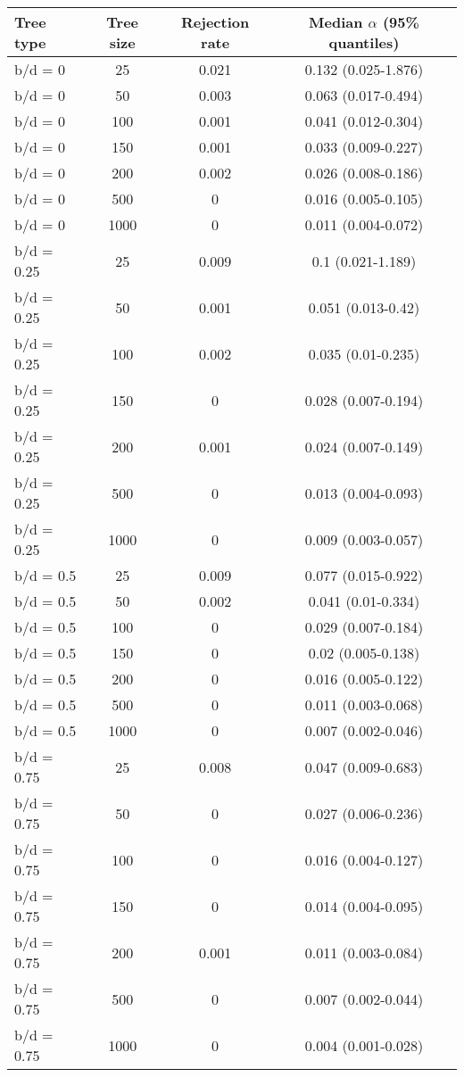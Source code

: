 \begin{tabular}{lccc}
     \hline
     \textbf{Tree type} & \textbf{Tree size} & \textbf{Rejection rate}  & \textbf{Median $\alpha$ (95\% quantiles)}    \\
     \hline
b/d = 0   &    25   &    0.021     &    0.132 (0.025-1.876) \\
b/d = 0   &    50   &    0.003     &    0.063 (0.017-0.494) \\
b/d = 0   &    100  &    0.001     &    0.041 (0.012-0.304) \\
b/d = 0   &    150  &    0.001     &    0.033 (0.009-0.227) \\
b/d = 0   &    200  &    0.002     &    0.026 (0.008-0.186) \\
b/d = 0   &    500  &    0    &    0.016 (0.005-0.105) \\
b/d = 0   &    1000 &    0    &    0.011 (0.004-0.072) \\
b/d = 0.25     &    25   &    0.009     &    0.1 (0.021-1.189)   \\
b/d = 0.25     &    50   &    0.001     &    0.051 (0.013-0.42)  \\
b/d = 0.25     &    100  &    0.002     &    0.035 (0.01-0.235)  \\
b/d = 0.25     &    150  &    0    &    0.028 (0.007-0.194) \\
b/d = 0.25     &    200  &    0.001     &    0.024 (0.007-0.149) \\
b/d = 0.25     &    500  &    0    &    0.013 (0.004-0.093) \\
b/d = 0.25     &    1000 &    0    &    0.009 (0.003-0.057) \\
b/d = 0.5 &    25   &    0.009     &    0.077 (0.015-0.922) \\
b/d = 0.5 &    50   &    0.002     &    0.041 (0.01-0.334)  \\
b/d = 0.5 &    100  &    0    &    0.029 (0.007-0.184) \\
b/d = 0.5 &    150  &    0    &    0.02 (0.005-0.138)  \\
b/d = 0.5 &    200  &    0    &    0.016 (0.005-0.122) \\
b/d = 0.5 &    500  &    0    &    0.011 (0.003-0.068) \\
b/d = 0.5 &    1000 &    0    &    0.007 (0.002-0.046) \\
b/d = 0.75     &    25   &    0.008     &    0.047 (0.009-0.683) \\
b/d = 0.75     &    50   &    0    &    0.027 (0.006-0.236) \\
b/d = 0.75     &    100  &    0    &    0.016 (0.004-0.127) \\
b/d = 0.75     &    150  &    0    &    0.014 (0.004-0.095) \\
b/d = 0.75     &    200  &    0.001     &    0.011 (0.003-0.084) \\
b/d = 0.75     &    500  &    0    &    0.007 (0.002-0.044) \\
b/d = 0.75     &    1000 &    0    &    0.004 (0.001-0.028) \\
     \hline
\end{tabular}